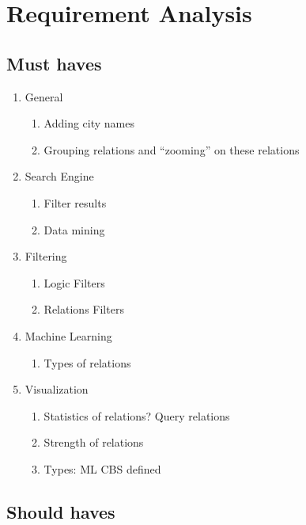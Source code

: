 \section {Requirement Analysis}

\subsection {Must haves}

\begin{enumerate}
    \item{General} 
    \begin{enumerate}
        \item Adding city names
        \item Grouping relations and “zooming” on these relations
    \end{enumerate}
    
    \item{Search Engine} 
    \begin{enumerate}
        \item Filter results
        \item Data mining
    \end{enumerate}
    
    \item{Filtering} 
    \begin{enumerate}
        \item Logic Filters 
        \item Relations Filters
    \end{enumerate}
    
    \item{Machine Learning} 
    \begin{enumerate}
        \item Types of relations
    \end{enumerate}
    
    \item{Visualization}
    \begin{enumerate}
        \item Statistics of relations? Query relations
        \item Strength of relations
        \item Types: ML CBS defined
    \end{enumerate}
\end{enumerate}


\subsection {Should haves}

